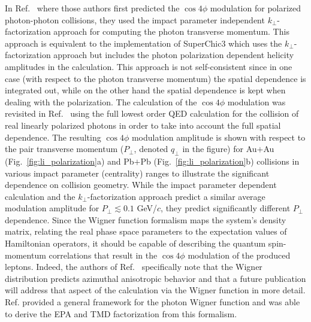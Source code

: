 \documentclass[twocolumn,epjc3]{svjour3}\sloppy
\begin{document}
In Ref.~\cite{liProbingLinearPolarization2019} where those authors first predicted the $\cos4\phi$ modulation for polarized photon-photon collisions, they used the impact parameter independent $k_\perp$-factorization approach for computing the photon transverse momentum. 
This approach is equivalent to the implementation of SuperChic3 which uses the $k_\perp$-factorization approach but includes the photon polarization dependent helicity amplitudes in the calculation. 
This approach is not self-consistent since in one case (with respect to the photon transverse momentum) the spatial dependence is integrated out, while on the other hand the spatial dependence is kept when dealing with the polarization. 
The calculation of the $\cos4\phi$ modulation was revisited in Ref.~\cite{liImpactParameterDependence2020} using the full lowest order QED calculation for the collision of real linearly polarized photons in order to take into account the full spatial dependence. 
The resulting $\cos4\phi$ modulation amplitude is shown with respect to the pair transverse momentum ($P_\perp$, denoted $q_\perp$ in the figure) for Au$+$Au (Fig.~\ref{fig:li_polarization}a) and Pb$+$Pb (Fig.~\ref{fig:li_polarization}b) collisions in various impact parameter (centrality) ranges to illustrate the significant dependence on collision geometry. 
While the impact parameter dependent calculation and the $k_\perp$-factorization approach predict a similar average modulation amplitude for $P_\perp \lesssim 0.1 $ GeV/$c$, they predict significantly different $P_\perp$ dependence.
Since the Wigner function formalism maps the system's density matrix, relating the real phase space parameters to the expectation values of Hamiltonian operators, it should be capable of describing the quantum spin-momentum correlations that result in the $\cos4\phi$ modulation of the produced leptons. Indeed, the authors of Ref.~\cite{klusek-gawendaCentralityDependenceDilepton2021} specifically note that the Wigner distribution predicts azimuthal anisotropic behavior and that a future publication will address that aspect of the calculation via the Wigner function in more detail. Ref.\cite{Wang:2021kxm} provided a  general framework for the photon Wigner function and was able to derive the EPA and TMD factorization from this formalism. 
\end{document}
